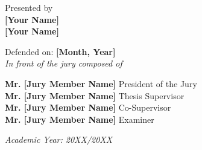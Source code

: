 \begin{titlepage}
\normalsize Presented by\\
{\normalsize \textbf{[Your Name]}}\\
{\normalsize \textbf{[Your Name]}}\\

\vspace{0.2cm}

{\normalsize Defended on: \textbf{[Month, Year]}}\\
{\normalsize \textit{In front of the jury composed of}}\\

\vspace{0.2cm}

\begin{center}
    {\normalsize \textbf{Mr. [Jury Member Name]} \hfill President of the Jury}\\
    {\normalsize \textbf{Mr. [Jury Member Name]} \hfill Thesis Supervisor}\\
    {\normalsize \textbf{Mr. [Jury Member Name]} \hfill Co-Supervisor}\\
    {\normalsize \textbf{Mr. [Jury Member Name]} \hfill Examiner}\\
\end{center}

\vspace{0.5cm}

\normalsize \textit{Academic Year: 20XX/20XX}
\end{titlepage}
